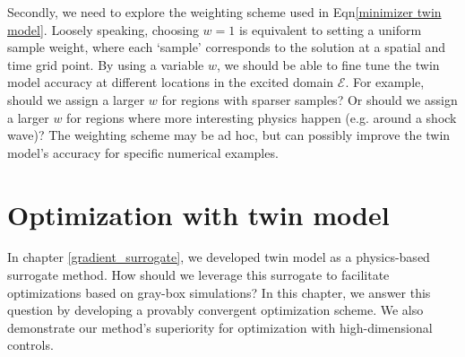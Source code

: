 \documentclass[a4paper,onecolumn]{article}
\theoremstyle{remark}
\begin{document}
\noindent Secondly, we need to explore the weighting scheme used in Eqn\eqref{minimizer twin model}.
Loosely speaking, choosing $w=1$ is equivalent to setting a uniform sample weight, where each `sample'
corresponds to the solution at a spatial and time grid point.
By using a variable $w$, we should be able to fine tune the twin model accuracy at different locations
in the excited domain $\mathcal{E}$. For example, should we assign a larger $w$
for regions with sparser samples? Or should we assign a larger $w$ for regions where
more interesting physics happen (e.g. around a shock wave)?
The weighting scheme may be ad hoc, but can possibly 
improve the twin model's accuracy for specific numerical examples.\\



\newpage
\section{Optimization with twin model}
\noindent In chapter \ref{gradient_surrogate},
we developed twin model as a physics-based surrogate method.
How should we leverage this surrogate to facilitate optimizations based on gray-box simulations?
In this chapter, we answer this question by developing a provably convergent optimization scheme.
We also demonstrate our method's superiority for optimization with high-dimensional controls.\\
\end{document}
